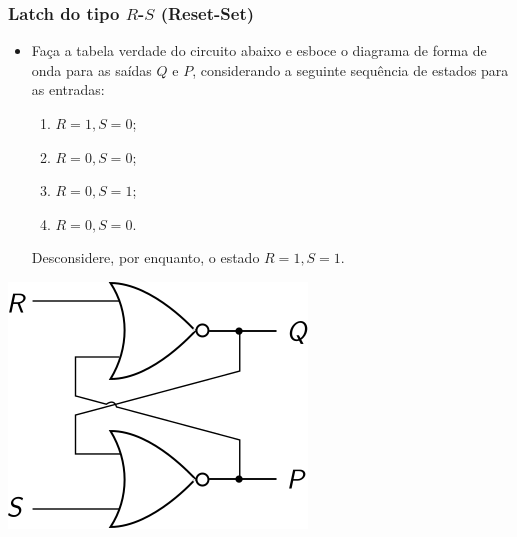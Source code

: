 \documentclass{beamer}
\begin{document}
\begin{frame}
\frametitle{Latch do tipo $R$-$S$ (Reset-Set)}

\begin{itemize}
\item Faça a tabela verdade do circuito abaixo e esboce o diagrama
      de forma de onda para as saídas $Q$ e $P$, considerando a seguinte
      sequência de estados para as entradas:
	\begin{enumerate}
	\item $R = 1, S = 0$;
	\item $R = 0, S = 0$;
	\item $R = 0, S = 1$;
	\item $R = 0, S = 0$.
	\end{enumerate}
      Desconsidere, por enquanto, o estado $R = 1, S = 1$.
\end{itemize}
\begin{center}
\includegraphics{images/circuit3}
\end{center}

\end{frame}
\end{document}
